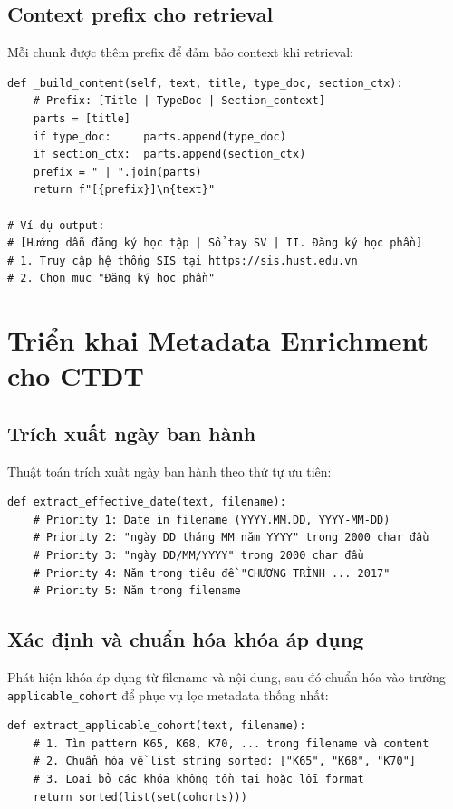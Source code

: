\documentclass[../DoAn.tex]{subfiles}
\begin{document}
\subsection{Context prefix cho retrieval}
Mỗi chunk được thêm prefix để đảm bảo context khi retrieval:
\begin{verbatim}
def _build_content(self, text, title, type_doc, section_ctx):
    # Prefix: [Title | TypeDoc | Section_context]
    parts = [title]
    if type_doc:     parts.append(type_doc)
    if section_ctx:  parts.append(section_ctx)
    prefix = " | ".join(parts)
    return f"[{prefix}]\n{text}"

# Ví dụ output:
# [Hướng dẫn đăng ký học tập | Sổ tay SV | II. Đăng ký học phần]
# 1. Truy cập hệ thống SIS tại https://sis.hust.edu.vn
# 2. Chọn mục "Đăng ký học phần"
\end{verbatim}

\section{Triển khai Metadata Enrichment cho CTDT}

\subsection{Trích xuất ngày ban hành}
Thuật toán trích xuất ngày ban hành theo thứ tự ưu tiên:
\begin{verbatim}
def extract_effective_date(text, filename):
    # Priority 1: Date in filename (YYYY.MM.DD, YYYY-MM-DD)
    # Priority 2: "ngày DD tháng MM năm YYYY" trong 2000 char đầu
    # Priority 3: "ngày DD/MM/YYYY" trong 2000 char đầu
    # Priority 4: Năm trong tiêu đề "CHƯƠNG TRÌNH ... 2017"
    # Priority 5: Năm trong filename
\end{verbatim}

\subsection{Xác định và chuẩn hóa khóa áp dụng}
Phát hiện khóa áp dụng từ filename và nội dung, sau đó chuẩn hóa vào trường \texttt{applicable\_cohort} để phục vụ lọc metadata thống nhất:
\begin{verbatim}
def extract_applicable_cohort(text, filename):
    # 1. Tìm pattern K65, K68, K70, ... trong filename và content
    # 2. Chuẩn hóa về list string sorted: ["K65", "K68", "K70"]
    # 3. Loại bỏ các khóa không tồn tại hoặc lỗi format
    return sorted(list(set(cohorts)))
\end{verbatim}
\end{document}
